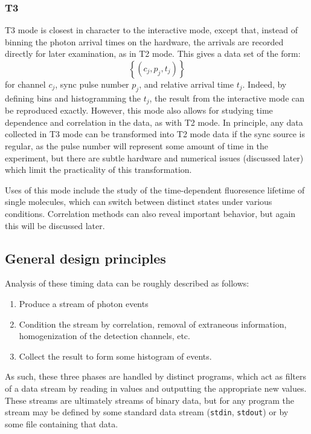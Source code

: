 \documentclass{article}
\newcommand{\braces}[1]{\ensuremath{\left\lbrace #1 \right\rbrace}}
\newcommand{\stdin}{\texttt{stdin}}
\newcommand{\stdout}{\texttt{stdout}}
\begin{document}
\subsubsection{T3}
T3 mode is closest in character to the interactive mode, except that, instead of binning the photon arrival times on the hardware, the arrivals are recorded directly for later examination, as in T2 mode. This gives a data set of the form:
\begin{equation}
\braces{(c_{j}, p_{j}, t_{j})}
\end{equation}
for channel $c_{j}$, sync pulse number $p_{j}$, and relative arrival time $t_{j}$. Indeed, by defining bins and histogramming the $t_{j}$, the result from the interactive mode can be reproduced exactly. However, this mode also allows for studying time dependence and correlation in the data, as with T2 mode. In principle, any data collected in T3 mode can be transformed into T2 mode data if the sync source is regular, as the pulse number will represent some amount of time in the experiment, but there are subtle hardware and numerical issues (discussed later) which limit the practicality of this transformation.

Uses of this mode include the study of the time-dependent fluoresence lifetime of single molecules, which can switch between distinct states under various conditions. Correlation methods can also reveal important behavior, but again this will be discussed later.

\subsection{General design principles}
Analysis of these timing data can be roughly described as follows:
\begin{enumerate}
\item Produce a stream of photon events
\item Condition the stream by correlation, removal of extraneous information, homogenization of the detection channels, etc.
\item Collect the result to form some histogram of events.
\end{enumerate}
As such, these three phases are handled by distinct programs, which act as filters of a data stream by reading in values and outputting the appropriate new values. These streams are ultimately streams of binary data, but for any program the stream may be defined by some standard data stream (\stdin, \stdout) or by some file containing that data. 
\end{document}
